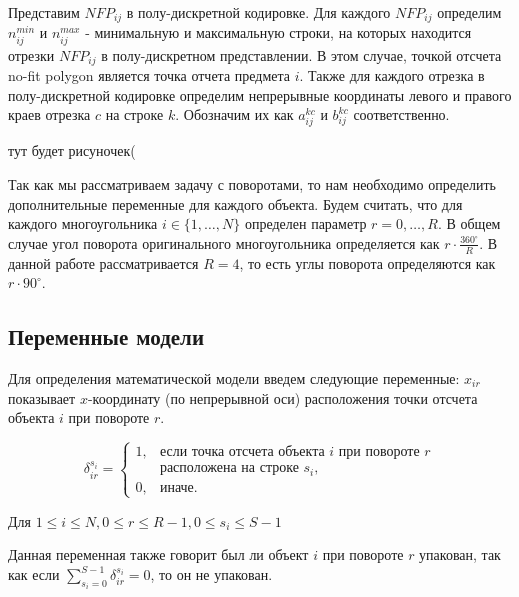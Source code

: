 \documentclass[a4paper]{article}
\begin{document}
    Представим $NFP_{ij}$ в полу-дискретной кодировке. Для каждого $NFP_{ij}$ определим $n_{ij}^{min}$ и $n_{ij}^{max}$ - минимальную и максимальную строки, на которых находится отрезки $NFP_{ij}$ в полу-дискретном представлении. В этом случае, точкой отсчета no-fit polygon является точка отчета предмета $i$. Также для каждого отрезка в полу-дискретной кодировке определим непрерывные координаты левого и правого краев отрезка $c$ на строке $k$. Обозначим их как $a_{ij}^{kc}$ и $b_{ij}^{kc}$ соответственно.

    \vspace{1cm} %
    тут будет рисуночек( 
    \vspace{1cm} %

    Так как мы рассматриваем задачу с поворотами, то нам необходимо определить дополнительные переменные для каждого объекта. Будем считать, что для каждого многоугольника $i \in \{ 1, \ldots, N\}$ определен параметр $r = 0, \ldots, R$. В общем случае угол поворота оригинального многоугольника определяется как $r \cdot \frac{360^\circ}{R}$. В данной работе рассматривается $R = 4$, то есть углы поворота определяются как $r \cdot 90^\circ$. 
    

    \subsection{Переменные модели}
    
    Для определения математической модели введем следующие переменные: 
    $x_{ir}$ показывает $x$-координату (по непрерывной оси) расположения точки отсчета объекта $i$ при повороте $r$. 
    
    \[
    \delta_{ir}^{s_i} = 
     \begin{cases}
    1, & \text{если точка отсчета объекта $i$ при повороте $r$}\\ & \text{расположена на строке $s_i$},\\
    0, & \text{иначе.}
    \end{cases}
    \]

    Для $1 \leq i \leq N, 0 \leq r \leq R - 1, 0 \leq s_i \leq S - 1$

    
    Данная переменная также говорит был ли объект $i$ при повороте $r$ упакован, так как если $\sum_{s_i=0}^{S - 1} \delta_{ir}^{s_i} = 0$, то он не упакован.
    
\end{document}
